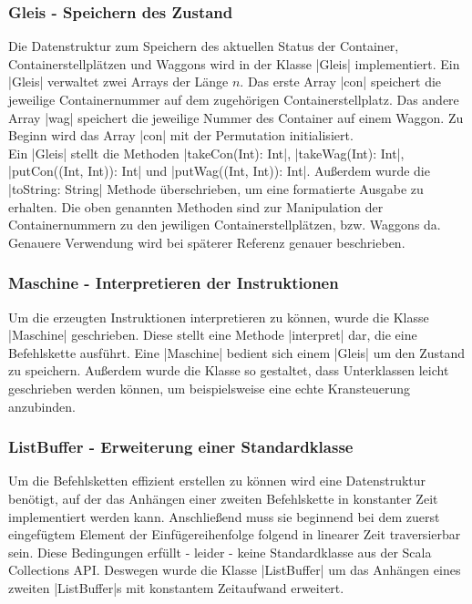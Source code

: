 \subsubsection{Gleis - Speichern des Zustand}
\label{gleis}
Die Datenstruktur zum Speichern des aktuellen Status der Container, Containerstellplätzen und Waggons wird in der Klasse |Gleis| implementiert.
Ein |Gleis| verwaltet zwei Arrays der Länge $n$. Das erste Array |con| speichert die jeweilige Containernummer auf dem zugehörigen Containerstellplatz.
Das andere Array |wag| speichert die jeweilige Nummer des Container auf einem Waggon.
Zu Beginn wird das Array |con| mit der Permutation initialisiert. \\
Ein |Gleis| stellt die Methoden |takeCon(Int): Int|, |takeWag(Int): Int|, |putCon((Int, Int)): Int| und |putWag((Int, Int)): Int|.
Außerdem wurde die |toString: String| Methode überschrieben, um eine formatierte Ausgabe zu erhalten.
Die oben genannten Methoden sind zur Manipulation der Containernummern zu den jewiligen Containerstellplätzen, bzw. Waggons da.
Genauere Verwendung wird bei späterer Referenz genauer beschrieben.

\subsubsection{Maschine - Interpretieren der Instruktionen}
Um die erzeugten Instruktionen interpretieren zu können, wurde die Klasse |Maschine| geschrieben.
Diese stellt eine Methode |interpret| dar, die eine Befehlskette ausführt.
Eine |Maschine| bedient sich einem |Gleis| um den Zustand zu speichern.
Außerdem wurde die Klasse so gestaltet, dass Unterklassen leicht geschrieben werden können, um beispielsweise eine echte Kransteuerung anzubinden.

\subsubsection{ListBuffer - Erweiterung einer Standardklasse}
Um die Befehlsketten effizient erstellen zu können wird eine Datenstruktur benötigt,
auf der das Anhängen einer zweiten Befehlskette in konstanter Zeit implementiert werden kann.
Anschließend muss sie beginnend bei dem zuerst eingefügtem Element der Einfügereihenfolge folgend in linearer Zeit traversierbar sein.
Diese Bedingungen erfüllt - leider - keine Standardklasse aus der Scala Collections API.
Deswegen wurde die Klasse |ListBuffer| um das Anhängen eines zweiten |ListBuffer|s mit konstantem Zeitaufwand erweitert.

